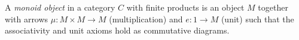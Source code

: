 A \emph{monoid object} in a category $C$ with finite products is an object $M$ together with arrows $\mu: M \times M \to M$ (multiplication) and $e: 1 \to M$ (unit) such that the associativity and unit axioms hold as commutative diagrams.
